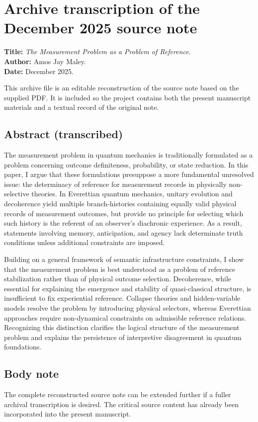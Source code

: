 \section*{Archive transcription of the December 2025 source note}

\noindent\textbf{Title:} \emph{The Measurement Problem as a Problem of Reference}.\\
\textbf{Author:} Amos Jay Maley.\\
\textbf{Date:} December 2025.

\medskip

This archive file is an editable reconstruction of the source note based on the supplied PDF. It is included so the project contains both the present manuscript materials and a textual record of the original note.

\subsection*{Abstract (transcribed)}

The measurement problem in quantum mechanics is traditionally formulated as a problem concerning outcome definiteness, probability, or state reduction. In this paper, I argue that these formulations presuppose a more fundamental unresolved issue: the determinacy of reference for measurement records in physically non-selective theories. In Everettian quantum mechanics, unitary evolution and decoherence yield multiple branch-histories containing equally valid physical records of measurement outcomes, but provide no principle for selecting which such history is the referent of an observer's diachronic experience. As a result, statements involving memory, anticipation, and agency lack determinate truth conditions unless additional constraints are imposed.

Building on a general framework of semantic infrastructure constraints, I show that the measurement problem is best understood as a problem of reference stabilization rather than of physical outcome selection. Decoherence, while essential for explaining the emergence and stability of quasi-classical structure, is insufficient to fix experiential reference. Collapse theories and hidden-variable models resolve the problem by introducing physical selectors, whereas Everettian approaches require non-dynamical constraints on admissible reference relations. Recognizing this distinction clarifies the logical structure of the measurement problem and explains the persistence of interpretive disagreement in quantum foundations.

\subsection*{Body note}

The complete reconstructed source note can be extended further if a fuller archival transcription is desired. The critical source content has already been incorporated into the present manuscript.
